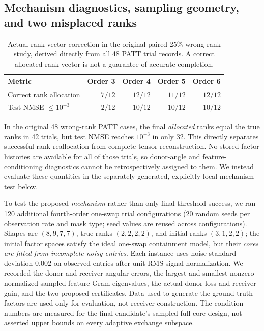 \documentclass[review,10pt]{elsarticle}
\begin{document}
\subsection{Mechanism diagnostics, sampling geometry, and two misplaced ranks}\label{subsec:mechanism}

\begin{table}[tbp]
\caption{Actual rank-vector correction in the original paired 25\% wrong-rank study, derived directly from all 48 PATT trial records. A correct allocated rank vector is not a guarantee of accurate completion.}\label{tab:rankcorrect}
\centering\small
\begin{tabular}{lrrrr}
\toprule
Metric & Order 3 & Order 4 & Order 5 & Order 6\\
\midrule
Correct rank allocation & $7/12$ & $12/12$ & $11/12$ & $12/12$\\
Test NMSE $\le10^{-3}$ & $2/12$ & $10/12$ & $10/12$ & $10/12$\\
\bottomrule
\end{tabular}
\end{table}

In the original 48 wrong-rank PATT cases, the final \emph{allocated} ranks equal the true ranks in 42 trials, but test NMSE reaches $10^{-3}$ in only 32. This directly separates successful rank reallocation from complete tensor reconstruction. No stored factor histories are available for all of those trials, so donor-angle and feature-conditioning diagnostics cannot be retrospectively assigned to them. We instead evaluate these quantities in the separately generated, explicitly local mechanism test below.

To test the proposed \emph{mechanism} rather than only final threshold success, we ran 120 additional fourth-order one-swap trial configurations (20 random seeds per observation rate and mask type; seed values are reused across configurations). Shapes are $(8,9,7,7)$, true ranks $(2,2,2,2)$, and initial ranks $(3,1,2,2)$; the initial factor spaces satisfy the ideal one-swap containment model, but their \emph{cores are fitted from incomplete noisy entries}. Each instance uses noise standard deviation $0.002$ on observed entries after unit-RMS signal normalization. We recorded the donor and receiver angular errors, the largest and smallest nonzero normalized sampled feature Gram eigenvalues, the actual donor loss and receiver gain, and the two proposed certificates. Data used to generate the ground-truth factors are used only for evaluation, not receiver construction. The condition numbers are measured for the final candidate's sampled full-core design, not asserted upper bounds on every adaptive exchange subspace.
\end{document}
